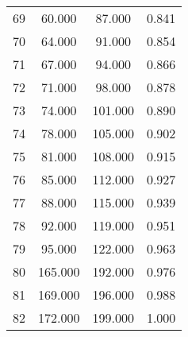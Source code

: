 \begin{tabular}{cccc}
  69 & 60.000 & 87.000 & 0.841 \\ 
  70 & 64.000 & 91.000 & 0.854 \\ 
  71 & 67.000 & 94.000 & 0.866 \\ 
  72 & 71.000 & 98.000 & 0.878 \\ 
  73 & 74.000 & 101.000 & 0.890 \\ 
  74 & 78.000 & 105.000 & 0.902 \\ 
  75 & 81.000 & 108.000 & 0.915 \\ 
  76 & 85.000 & 112.000 & 0.927 \\ 
  77 & 88.000 & 115.000 & 0.939 \\ 
  78 & 92.000 & 119.000 & 0.951 \\ 
  79 & 95.000 & 122.000 & 0.963 \\ 
  80 & 165.000 & 192.000 & 0.976 \\ 
  81 & 169.000 & 196.000 & 0.988 \\ 
  82 & 172.000 & 199.000 & 1.000 \\ 
   \hline
\end{tabular}
